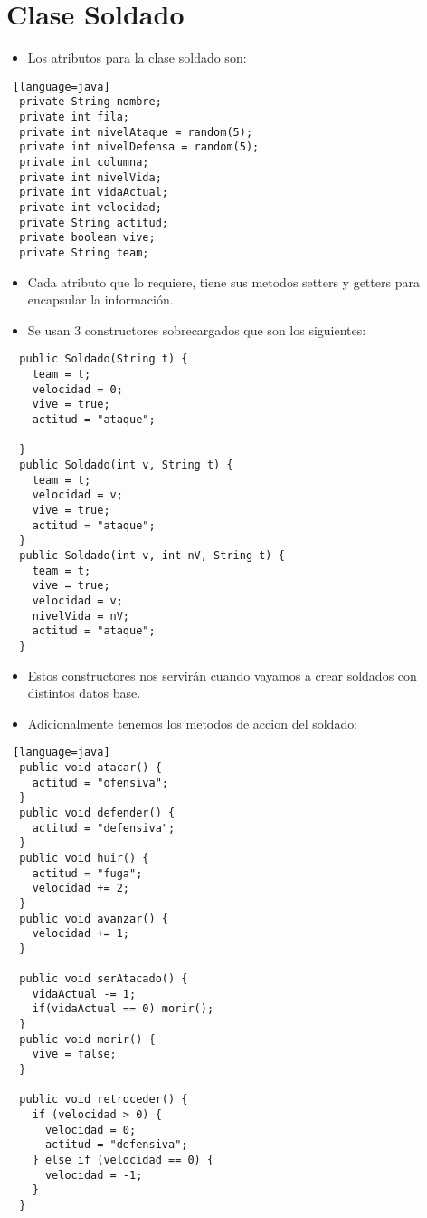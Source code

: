 \section{Clase Soldado}
\begin{itemize}
    \item Los atributos para la clase soldado son:
\end{itemize}
\begin{lstlisting} [language=java]
  private String nombre;
  private int fila;
  private int nivelAtaque = random(5);
  private int nivelDefensa = random(5);
  private int columna;
  private int nivelVida;
  private int vidaActual;
  private int velocidad;
  private String actitud;
  private boolean vive;
  private String team;
\end{lstlisting}
\begin{itemize}
  \item Cada atributo que lo requiere, tiene sus metodos setters y getters para encapsular la información.
    \item Se usan 3 constructores sobrecargados que son los siguientes:
\end{itemize}

\begin{lstlisting}
  public Soldado(String t) {
    team = t;
    velocidad = 0;
    vive = true;
    actitud = "ataque";

  }
  public Soldado(int v, String t) {
    team = t;
    velocidad = v;
    vive = true;
    actitud = "ataque";
  }
  public Soldado(int v, int nV, String t) {
    team = t;
    vive = true;
    velocidad = v;
    nivelVida = nV;
    actitud = "ataque";
  }
\end{lstlisting}

\begin{itemize}
    \item Estos constructores nos servirán cuando vayamos a crear soldados con distintos datos base. 
      \item Adicionalmente tenemos los metodos de accion del soldado:
\end{itemize}
\begin{lstlisting} [language=java]
  public void atacar() {
    actitud = "ofensiva";
  }
  public void defender() {
    actitud = "defensiva";
  }
  public void huir() {
    actitud = "fuga";
    velocidad += 2;
  }
  public void avanzar() {
    velocidad += 1;
  }

  public void serAtacado() {
    vidaActual -= 1;
    if(vidaActual == 0) morir();
  }
  public void morir() { 
    vive = false;
  }

  public void retroceder() {
    if (velocidad > 0) {
      velocidad = 0;
      actitud = "defensiva";
    } else if (velocidad == 0) {
      velocidad = -1; 
    }
  }
\end{lstlisting}

